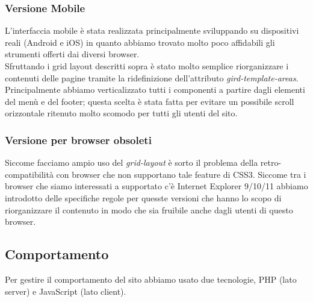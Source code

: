 \documentclass[1_relazione.tex]{subfiles}
\begin{document}
\subsubsection{Versione Mobile}
L'interfaccia mobile è stata realizzata principalmente sviluppando su dispositivi reali (Android e iOS) in quanto abbiamo trovato molto poco affidabili gli strumenti offerti dai diversi browser.\\
Sfruttando i grid layout descritti sopra è stato molto semplice riorganizzare i contenuti delle pagine tramite la ridefinizione dell'attributo \textit{gird-template-areas}.\\
Principalmente abbiamo verticalizzato tutti i componenti a partire dagli elementi del menù e del footer; questa scelta è stata fatta per evitare un possibile scroll orizzontale ritenuto molto scomodo per tutti gli utenti del sito.\\

\subsubsection{Versione per browser obsoleti}
Siccome facciamo ampio uso del \textit{grid-layout} è sorto il problema della retro-compatibilità con browser che non supportano tale feature di CSS3. Siccome tra i browser che siamo interessati a supportato c'è Internet Explorer 9/10/11 abbiamo introdotto delle specifiche regole per quesste versioni che hanno lo scopo di riorganizzare il contenuto in modo che sia fruibile anche dagli utenti di questo browser.

\subsection{Comportamento}
Per gestire il comportamento del sito abbiamo usato due tecnologie, PHP (lato server) e JavaScript (lato client).
\end{document}
